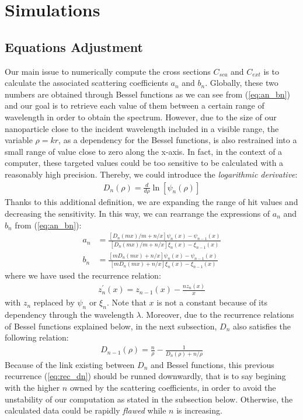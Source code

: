 \documentclass{article}
\numberwithin{equation}{section}
\begin{document}
\section{Simulations}

\subsection{Equations Adjustment}

Our main issue to numerically compute the cross sections $C_{sca}$ and $C_{ext}$ is to calculate the associated scattering coefficients $a_{n}$ and $b_{n}$. Globally, these two numbers are obtained through Bessel functions as we can see from (\ref{eq:an_bn}) and our goal is to retrieve each value of them between a certain range of wavelength in order to obtain the spectrum. However, due to the size of our nanoparticle close to the incident wavelength included in a visible range, the variable $\rho=kr$, as a dependency for the Bessel functions, is also restrained into a small range of value close to zero along the x-axis. In fact, in the context of a computer, these targeted values could be too sensitive to be calculated with a reasonably high precision. Thereby, we could introduce the \textit{logarithmic derivative}:
\begin{align}
D_{n}(\rho)=\frac{d}{d\rho}\ln[\psi_{n}(\rho)]
\end{align}
Thanks to this additional definition, we are expanding the range of hit values and decreasing the sensitivity. In this way, we can rearrange the expressions of $a_{n}$ and $b_{n}$ from (\ref{eq:an_bn}):
\begin{equation}
\begin{aligned}
a_{n}&=\frac{[D_{n}(mx)/m + n/x]\psi_{n}(x)-\psi_{n-1}(x)}{[D_{n}(mx)/m + n/x]\xi_{n}(x)-\xi_{n-1}(x)}\\
b_{n}&=\frac{[mD_{n}(mx) + n/x]\psi_{n}(x)-\psi_{n-1}(x)}{[mD_{n}(mx) + n/x]\xi_{n}(x)-\xi_{n-1}(x)}
\end{aligned}
\end{equation}
where we have used the recurrence relation:
\begin{align}
z^{'}_{n}(x)=z_{n-1}(x)-\frac{nz_{n}(x)}{x}
\end{align}
with $z_{n}$ replaced by $\psi_{n}$ or $\xi_{n}$. Note that $x$ is not a constant because of its dependency through the wavelength $\lambda$. Moreover, due to the recurrence relations of Bessel functions explained below, in the next subsection, $D_{n}$ also satisfies the following relation:
\begin{align}\label{eq:rec_dn}
D_{n-1}(\rho)=\frac{n}{\rho}-\frac{1}{D_{n}(\rho)+n/\rho}
\end{align}
Because of the link existing between $D_{n}$ and Bessel functions, this previous recurrence (\ref{eq:rec_dn}) should be runned downwardly, that is to say begining with the higher $n$ owned by the scattering coefficients, in order to avoid the unstability of our computation as stated in the subsection below. Otherwise, the calculated data could be rapidly \textit{flawed} while $n$ is increasing.
\end{document}
